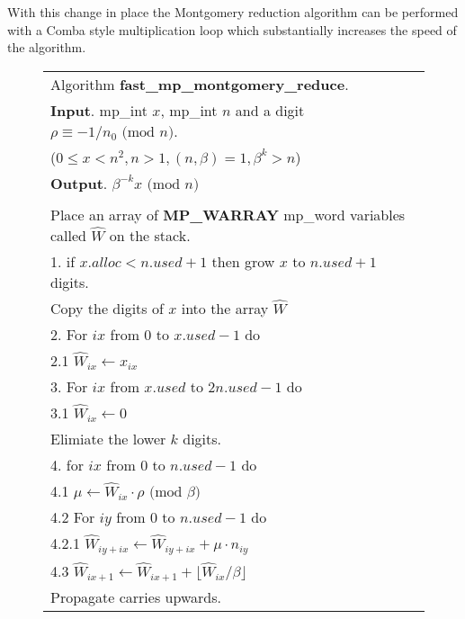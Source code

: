 \documentclass[b5paper]{book}
\begin{document}
With this change in place the Montgomery reduction algorithm can be performed with a Comba style multiplication loop which substantially increases
the speed of the algorithm.  

\newpage\begin{figure}[!here]
\begin{small}
\begin{center}
\begin{tabular}{l}
\hline Algorithm \textbf{fast\_mp\_montgomery\_reduce}. \\
\textbf{Input}.   mp\_int $x$, mp\_int $n$ and a digit $\rho \equiv -1/n_0 \mbox{ (mod }n\mbox{)}$. \\
\hspace{11.5mm}($0 \le x < n^2, n > 1, (n, \beta) = 1, \beta^k > n$) \\
\textbf{Output}.  $\beta^{-k}x \mbox{ (mod }n\mbox{)}$ \\
\hline \\
Place an array of \textbf{MP\_WARRAY} mp\_word variables called $\hat W$ on the stack. \\
1.  if $x.alloc < n.used + 1$ then grow $x$ to $n.used + 1$ digits. \\
Copy the digits of $x$ into the array $\hat W$ \\
2.  For $ix$ from $0$ to $x.used - 1$ do \\
\hspace{3mm}2.1  $\hat W_{ix} \leftarrow x_{ix}$ \\
3.  For $ix$ from $x.used$ to $2n.used - 1$ do \\
\hspace{3mm}3.1  $\hat W_{ix} \leftarrow 0$ \\
Elimiate the lower $k$ digits. \\
4.  for $ix$ from $0$ to $n.used - 1$ do \\
\hspace{3mm}4.1  $\mu \leftarrow \hat W_{ix} \cdot \rho \mbox{ (mod }\beta\mbox{)}$ \\
\hspace{3mm}4.2  For $iy$ from $0$ to $n.used - 1$ do \\
\hspace{6mm}4.2.1  $\hat W_{iy + ix} \leftarrow \hat W_{iy + ix} + \mu \cdot n_{iy}$ \\
\hspace{3mm}4.3  $\hat W_{ix + 1} \leftarrow \hat W_{ix + 1} + \lfloor \hat W_{ix} / \beta \rfloor$ \\
Propagate carries upwards. \\

\end{tabular}
\end{center}
\end{small}
\end{figure}
\end{document}
